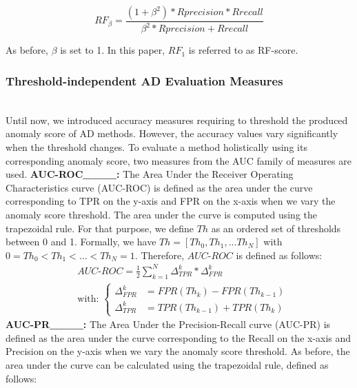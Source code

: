 \begin{equation}
RF_{\beta} = \frac{(1+\beta^2)*Rprecision*Rrecall}{\beta^2*Rprecision+Rrecall}
\end{equation}

\noindent As before, $\beta$ is set to 1. In this paper, $RF_1$ is referred to as RF-score.

\subsubsection{Threshold-independent AD Evaluation Measures} \hfill\\
Until now, we introduced accuracy measures requiring to threshold the produced anomaly score of AD methods. However, the accuracy values vary significantly when the threshold changes. To evaluate a method holistically using its corresponding anomaly score, two measures from the AUC family of measures are used.
\newline \textbf{AUC-ROC____: } The Area Under the Receiver Operating Characteristics curve (AUC-ROC) is defined as the area under the curve corresponding to TPR on the y-axis and FPR on the x-axis when we vary the anomaly score threshold. The area under the curve is computed using the trapezoidal rule. For that purpose, we define $Th$ as an ordered set of thresholds between 0 and 1. Formally, we have $Th=[Th_0,Th_1,...Th_N]$ with $0=Th_0<Th_1<...<Th_N=1$. Therefore, $AUC\text{-}ROC$ is defined as follows:
\begin{equation}
\begin{split}
&AUC\text{-}ROC = \frac{1}{2}\sum_{k=1}^{N} \Delta^{k}_{TPR}*\Delta^{k}_{FPR}\\
&\text{with: } \left.
\begin{cases}
\Delta^{k}_{FPR} &= FPR(Th_{k})-FPR(Th_{k-1})\\
\Delta^{k}_{TPR} &= TPR(Th_{k-1})+TPR(Th_{k})
\end{cases}
\right. 
\end{split}
\label{equAUCROC}
\end{equation}
\newline \textbf{AUC-PR____: } The Area Under the Precision-Recall curve (AUC-PR) is defined as the area under the curve corresponding to the Recall on the x-axis and Precision on the y-axis when we vary the anomaly score threshold. 
As before, the area under the curve can be calculated using the trapezoidal rule, defined as follows:

